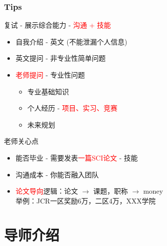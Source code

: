 \documentclass[slide]{../custom}
\begin{document}
\begin{frame}
  \frametitle{Tips}
  \begin{block}{复试 - 展示综合能力 - \textcolor{red}{沟通 + 技能}}
    \begin{itemize}
      \item 自我介绍 - 英文 (不能泄漏个人信息)
      \item 英文提问 - 非专业性简单问题
      \item \textcolor{red}{老师提问} - 专业性问题
        \begin{itemize}
          \item 专业基础知识
          \item 个人经历 - \textcolor{red}{项目、实习、竞赛}
          \item 未来规划
        \end{itemize}
    \end{itemize}
  \end{block}
  \begin{alertblock}{老师关心点}
    \begin{itemize}
      \item 能否毕业 - 需要发表\textcolor{red}{一篇SCI论文} - 技能
      \item 沟通成本 - 你能否融入团队
      \item \textcolor{red}{论文导向}逻辑：论文 $\rightarrow$ 课题，职称 $\rightarrow$ money  \\ 举例：JCR一区奖励6万，二区4万，XXX学院
    \end{itemize}
  \end{alertblock}
\end{frame}

\section{导师介绍}
\end{document}
